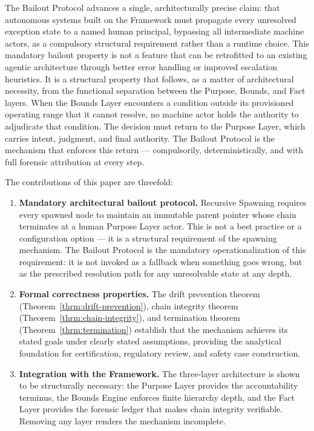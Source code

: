 The Bailout Protocol advances a single, architecturally precise claim: that autonomous systems built on the \bxthree{} Framework must propagate every unresolved exception state to a named human principal, bypassing all intermediate machine actors, as a compulsory structural requirement rather than a runtime choice. This mandatory bailout property is not a feature that can be retrofitted to an existing agentic architecture through better error handling or improved escalation heuristics. It is a structural property that follows, as a matter of architectural necessity, from the functional separation between the Purpose, Bounds, and Fact layers. When the Bounds Layer encounters a condition outside its provisioned operating range that it cannot resolve, no machine actor holds the authority to adjudicate that condition. The decision must return to the Purpose Layer, which carries intent, judgment, and final authority. The Bailout Protocol is the mechanism that enforces this return — compulsorily, deterministically, and with full forensic attribution at every step.

The contributions of this paper are threefold:

\begin{enumerate}
    \itemsep0em
    \item \textbf{Mandatory architectural bailout protocol.} Recursive Spawning requires every spawned node to maintain an immutable parent pointer whose chain terminates at a human Purpose Layer actor. This is not a best practice or a configuration option — it is a structural requirement of the spawning mechanism. The Bailout Protocol is the mandatory operationalization of this requirement: it is not invoked as a fallback when something goes wrong, but as the prescribed resolution path for any unresolvable state at any depth.
    \item \textbf{Formal correctness properties.} The drift prevention theorem (Theorem~\ref{thrm:drift-prevention}), chain integrity theorem (Theorem~\ref{thrm:chain-integrity}), and termination theorem (Theorem~\ref{thrm:termination}) establish that the mechanism achieves its stated goals under clearly stated assumptions, providing the analytical foundation for certification, regulatory review, and safety case construction.
    \item \textbf{Integration with the \bxthree{} Framework.} The three-layer architecture is shown to be structurally necessary: the Purpose Layer provides the accountability terminus, the Bounds Engine enforces finite hierarchy depth, and the Fact Layer provides the forensic ledger that makes chain integrity verifiable. Removing any layer renders the mechanism incomplete.
\end{enumerate}


